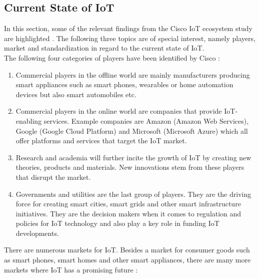 	\subsection{Current State of IoT}
	\vspace{-1em}
		In this section, some of the relevant findings from the Cisco IoT ecosystem study are highlighted \cite{cisco}. The following three topics are of special interest, namely players, market and standardization in regard to the current state of IoT.\\
		The following four categories of players have been identified by Cisco \cite{cisco}:
		\vspace{-1em}
		\begin{enumerate}
			\item Commercial players in the offline world are mainly manufacturers producing smart appliances such as smart phones, wearables or home automation devices but also smart automobiles etc.

			\item Commercial players in the online world are companies that provide IoT-enabling services. Example companies are Amazon (Amazon Web Services), Google (Google Cloud Platform) and Microsoft (Microsoft Azure) which all offer platforms and services that target the IoT market.

			\item Research and academia will further incite the growth of IoT by creating new theories, products and materials. New innovations stem from these players that disrupt the market.

			\item Governments and utilities are the last group of players. They are the driving force for creating smart cities, smart grids and other smart infrastructure initiatives. They are the decision makers when it comes to regulation and policies for IoT technology and also play a key role in funding IoT developments.
		\end{enumerate}
		\vspace{-1em}
		There are numerous markets for IoT. Besides a market for consumer goods such as smart phones, smart homes and other smart appliances, there are many more markets where IoT has a promising future \cite{cisco}:
		\vspace{-1em}
